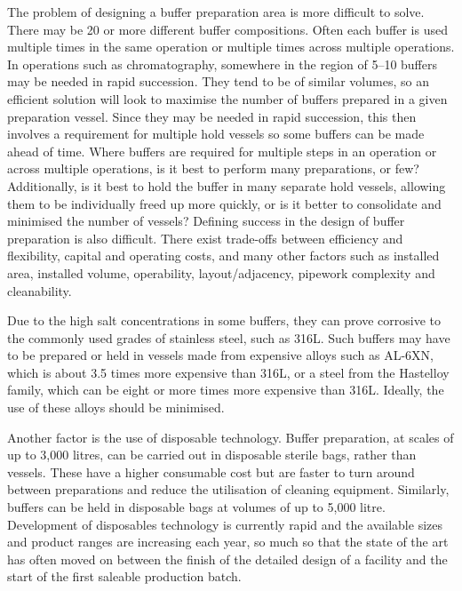 The problem of designing a buffer preparation area is more difficult to solve.
There may be 20 or more different buffer compositions.  Often each buffer is
used multiple times in the same operation or multiple times across multiple
operations.  In operations such as chromatography, somewhere in the region of
5--10 buffers may be needed in rapid succession.  They tend to be of similar 
volumes, so an efficient solution will look to maximise the number of buffers
prepared in a given preparation vessel.  Since they may be needed in rapid
succession, this then involves a requirement for multiple hold vessels so
some buffers can be made ahead of time.  Where buffers are required for multiple
steps in an operation or across multiple operations, is it best to perform
many preparations, or few?  Additionally, is it best to hold the buffer
in many separate hold vessels, allowing them to be individually freed up more
quickly, or is it better to consolidate and minimised the number of vessels?
Defining success in the design of buffer preparation is also difficult.
There exist trade-offs between efficiency and flexibility, capital and 
operating costs, and many other factors such as installed area, installed 
volume, operability, layout/adjacency, pipework complexity and cleanability.

Due to the high salt concentrations in some buffers, they can prove corrosive
to the commonly used grades of stainless steel, such as 316L.  Such buffers
may have to be prepared or held in vessels made from expensive alloys such as
AL-6XN\textsuperscript{\textregistered}, which is about 3.5 times more
expensive than 316L, or a steel from the
Hastelloy\textsuperscript{\textregistered} family, which can be eight or more
times more expensive than 316L.
Ideally, the use of these alloys should be minimised.

Another factor is the use of disposable technology.  Buffer preparation, at
scales of up to 3,000 litres, can be carried out in disposable sterile bags,
rather than vessels.  These have a higher consumable cost but are faster to turn
around between preparations and reduce the utilisation of cleaning equipment.
Similarly, buffers can be held in disposable bags at volumes of up to 5,000
litre.  Development of disposables technology is currently rapid and the
available sizes and product ranges are increasing each year, so much so that 
the state of the art has often moved on between the finish of the detailed
design of a facility and the start of the first saleable production batch.


